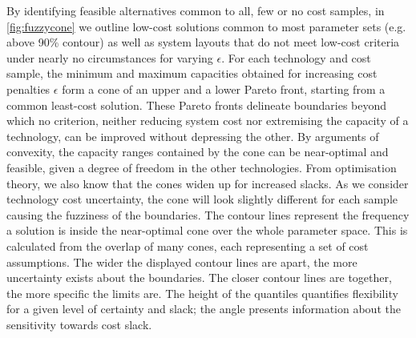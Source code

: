 By identifying feasible alternatives common to all, few or no cost samples, in
\cref{fig:fuzzycone} we outline low-cost solutions common to most parameter sets
(e.g. above 90\% contour) as well as system layouts that do not meet low-cost
criteria under nearly no circumstances for varying $\epsilon$. For each
technology and cost sample, the minimum and maximum capacities obtained for
increasing cost penalties $\epsilon$ form a cone of an upper and a lower Pareto
front, starting from a common least-cost solution. These Pareto fronts delineate
boundaries beyond which no criterion, neither reducing system cost nor
extremising the capacity of a technology, can be improved without depressing the
other. By arguments of convexity, the capacity ranges contained by the cone can
be near-optimal and feasible, given a degree of freedom in the other
technologies. From optimisation theory, we also know that the cones widen up for
increased slacks. As we consider technology cost uncertainty, the cone will look
slightly different for each sample causing the fuzziness of the boundaries. The
contour lines represent the frequency a solution is inside the near-optimal cone
over the whole parameter space. This is calculated from the overlap of many
cones, each representing a set of cost assumptions. The wider the displayed
contour lines are apart, the more uncertainty exists about the boundaries. The
closer contour lines are together, the more specific the limits are. The height
of the quantiles quantifies flexibility for a given level of certainty and
slack; the angle presents information about the sensitivity towards cost slack.

